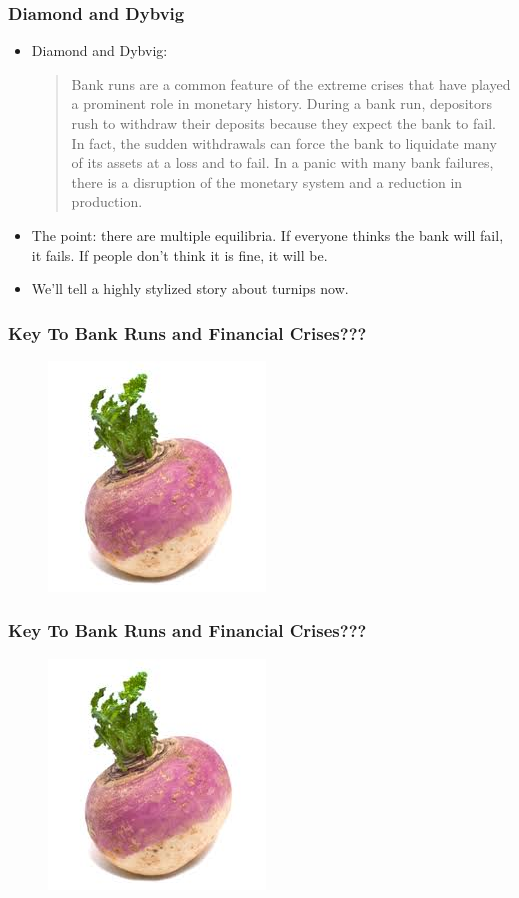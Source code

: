 \documentclass{beamer}
\begin{document}
\begin{frame}
\frametitle{Diamond and Dybvig}
\begin{itemize}
\item<1-> Diamond and Dybvig:
\blockquote{Bank runs are a common feature of the extreme crises that have played a prominent role in monetary history. During a bank run, depositors rush to withdraw their deposits because they expect the bank to fail. In fact, the sudden withdrawals can force the bank to liquidate many of its assets at a loss and to fail. In a panic with many bank failures, there is a disruption of the monetary system and a reduction in production.}
\item<2-> The point: there are multiple equilibria.  If everyone thinks the bank will fail, it fails.  If people don't think it is fine, it will be.
\bigskip
\item<3-> We'll tell a highly stylized story about turnips now.  
\end{itemize}
\end{frame}

\begin{frame}
\frametitle{Key To Bank Runs and Financial Crises???}
\begin{figure}
\centering
\includegraphics[scale=0.05]{Figures/turnip.jpg}
\end{figure}
\end{frame}

\begin{frame}
\frametitle{Key To Bank Runs and Financial Crises???}
\begin{figure}
\centering
\includegraphics[scale=0.2]{Figures/turnip.jpg}
\end{figure}
\end{frame}
\end{document}
